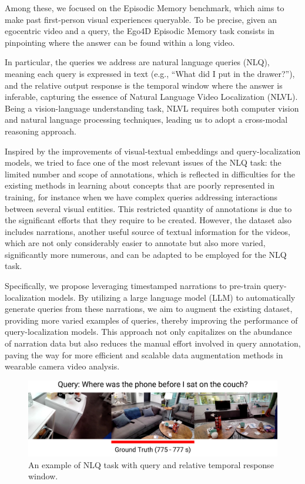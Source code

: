 \documentclass[10pt,twocolumn,letterpaper]{article}
\begin{document}
Among these, we focused on the Episodic Memory benchmark, which aims to make past first-person visual experiences queryable. To be precise, given an egocentric video and a query, the Ego4D Episodic Memory task consists in pinpointing where the answer can be found within a long video.

In particular, the queries we address are natural language queries (NLQ), meaning each query is expressed in text (e.g., “What did I put in the drawer?”), and the relative output response is the temporal window where the answer is inferable, capturing the essence of Natural Language Video Localization (NLVL).
Being a vision-language understanding task, NLVL requires both computer vision and natural language processing techniques, leading us to adopt a cross-modal reasoning approach.

Inspired by the improvements of visual-textual embeddings and query-localization models, we tried to face one of the most relevant issues of the NLQ task: the limited number and scope of annotations, which is reflected in difficulties for the existing methods in learning about concepts that are poorly represented in training, for instance when we have complex queries addressing interactions between several visual entities.
This restricted quantity of annotations is due to the significant efforts that they require to be created. However, the dataset also includes narrations, another useful source of textual information for the videos, which are not only considerably easier to annotate but also more varied, significantly more numerous, and can be adapted to be employed for the NLQ task.

Specifically, we propose leveraging timestamped narrations to pre-train query-localization models. By utilizing a large language model (LLM) to automatically generate queries from these narrations, we aim to augment the existing dataset, providing more varied examples of queries, thereby improving the performance of query-localization models. This approach not only capitalizes on the abundance of narration data but also reduces the manual effort involved in query annotation, paving the way for more efficient and scalable data augmentation methods in wearable camera video analysis.

\begin{figure}[t]
   \centering
   \includegraphics[width=1\linewidth]{images/merged_image_with_description_large_font.pdf}
   \caption{An example of NLQ task with query and relative temporal response window.}
   \label{fig:nlq_task}
\end{figure}
 
\end{document}
